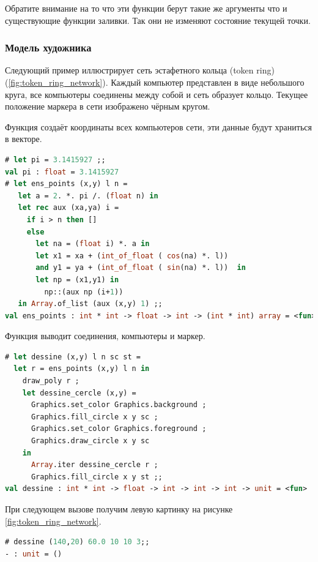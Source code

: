 Обратите внимание на то что эти функции берут такие же аргументы что и 
существующие функции заливки. Так они не изменяют состояние текущей точки.

\subsubsection{Модель художника}

Следующий пример иллюстрирует сеть эстафетного кольца (token ring) 
(\ref{fig:token_ring_network}). Каждый компьютер представлен в виде небольшого 
круга, все компьютеры соединены между собой и сеть образует кольцо. Текущее 
положение маркера в сети изображено чёрным кругом.

Функция  создаёт координаты всех компьютеров сети, эти данные 
будут храниться в векторе.

\begin{lstlisting}[language=OCaml]
# let pi = 3.1415927 ;;
val pi : float = 3.1415927
# let ens_points (x,y) l n = 
   let a = 2. *. pi /. (float n) in
   let rec aux (xa,ya) i = 
     if i > n then [] 
     else 
       let na = (float i) *. a in 
       let x1 = xa + (int_of_float ( cos(na) *. l))
       and y1 = ya + (int_of_float ( sin(na) *. l))  in
       let np = (x1,y1) in
         np::(aux np (i+1)) 
   in Array.of_list (aux (x,y) 1) ;;
val ens_points : int * int -> float -> int -> (int * int) array = <fun>
\end{lstlisting}

Функция  выводит соединения, компьютеры и маркер.

\begin{lstlisting}[language=OCaml]
# let dessine (x,y) l n sc st = 
  let r = ens_points (x,y) l n in 
    draw_poly r ;
    let dessine_cercle (x,y) = 
      Graphics.set_color Graphics.background ; 
      Graphics.fill_circle x y sc ; 
      Graphics.set_color Graphics.foreground ; 
      Graphics.draw_circle x y sc
    in 
      Array.iter dessine_cercle r ;
      Graphics.fill_circle x y st ;;
val dessine : int * int -> float -> int -> int -> int -> unit = <fun>
\end{lstlisting}

При следующем вызове получим левую картинку на рисунке 
\ref{fig:token_ring_network}.

\begin{lstlisting}[language=OCaml]
# dessine (140,20) 60.0 10 10 3;;
- : unit = ()
\end{lstlisting}

